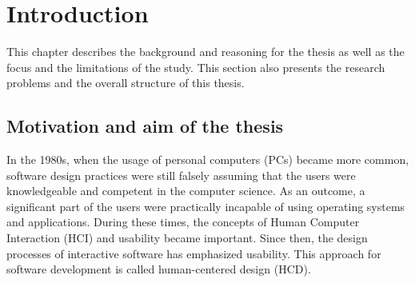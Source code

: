 \documentclass[12pt,a4paper,oneside,pdftex]{report}
\begin{document}
\cleardoublepage
\tableofcontents



\label{pages-prelude}
\cleardoublepage

\startfirstchapter

\pagestyle{headings}


% 

\chapter{Introduction}
\label{chapter:introduction}
This chapter describes the background and reasoning for the thesis as well as the focus and the limitations of the study. This section also presents the research problems and the overall structure of this thesis. 

\section{Motivation and aim of the thesis}
\label{sec:motivationandaim}
In the 1980s, when the usage of personal computers (PCs) became more common, software design practices were still falsely assuming that the users were knowledgeable and competent in the computer science. As an outcome, a significant part of the users were practically incapable of using operating systems and applications. During these times, the concepts of Human Computer Interaction (HCI) and usability became important. Since then, the design processes of interactive software has emphasized usability. This approach for software development is called human-centered design (HCD). \cite{RefWorks:9}
\end{document}
